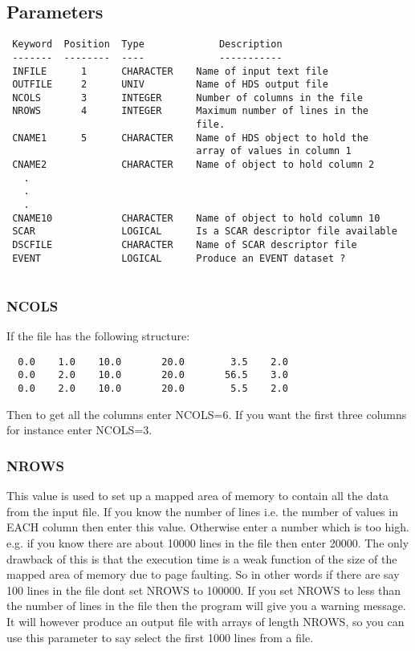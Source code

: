 \documentclass{book}
\renewcommand{\_}{{\tt\char'137}}     %
\begin{document}
\subsection{Parameters}
\begin{verbatim}
 Keyword  Position  Type             Description
 -------  --------  ----             -----------
 INFILE      1      CHARACTER    Name of input text file
 OUTFILE     2      UNIV         Name of HDS output file
 NCOLS       3      INTEGER      Number of columns in the file
 NROWS       4      INTEGER      Maximum number of lines in the
                                 file.
 CNAME1      5      CHARACTER    Name of HDS object to hold the
                                 array of values in column 1
 CNAME2             CHARACTER    Name of object to hold column 2
   .
   .
   .
 CNAME10            CHARACTER    Name of object to hold column 10
 SCAR               LOGICAL      Is a SCAR descriptor file available
 DSCFILE            CHARACTER    Name of SCAR descriptor file
 EVENT              LOGICAL      Produce an EVENT dataset ?
 
\end{verbatim}\subsubsection{NCOLS}
If the file has the following structure:
\begin{verbatim}
  0.0    1.0    10.0       20.0        3.5    2.0
  0.0    2.0    10.0       20.0       56.5    3.0
  0.0    2.0    10.0       20.0        5.5    2.0
\end{verbatim}
Then to get all the columns enter NCOLS=6.
If you want the first three columns for instance enter NCOLS=3.
 
\subsubsection{NROWS}
This value is used to set up a mapped area of memory to contain all
the data from the input file. If you know the number of lines i.e.
the number of values in EACH column then enter this value. Otherwise
enter a number which is too high. e.g. if you know there are
about 10000 lines in the file then enter 20000. The only drawback of this
is that the execution time is a weak function of the size of the mapped
area of memory due to page faulting. So in other words if there are
say 100 lines in the file dont set NROWS to 100000. If you set NROWS to
less than the number of lines in the file then the program will
give you a warning message. It will however produce an output file
with arrays of length NROWS, so you can use this parameter to say
select the first 1000 lines from a file.
 
\end{document}

